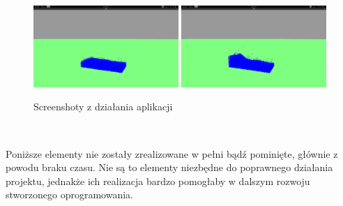 \documentclass[polish, 12pt]{aghthesis}
\begin{document}
\begin{figure}[h!]
		\includegraphics[width=0.49\textwidth]{7.png}
		\includegraphics[width=0.49\textwidth]{8.png}
		\caption{Screenshoty z działania aplikacji}
		\label{img:screen}
	\end{figure}
		
	$\,$		
	
		Poniższe elementy nie zostały zrealizowane w pełni bądź pominięte, głównie z powodu braku czasu. Nie są to elementy niezbędne do poprawnego działania projektu, jednakże ich realizacja bardzo pomogłaby w dalszym rozwoju stworzonego oprogramowania.
		
\end{document}
